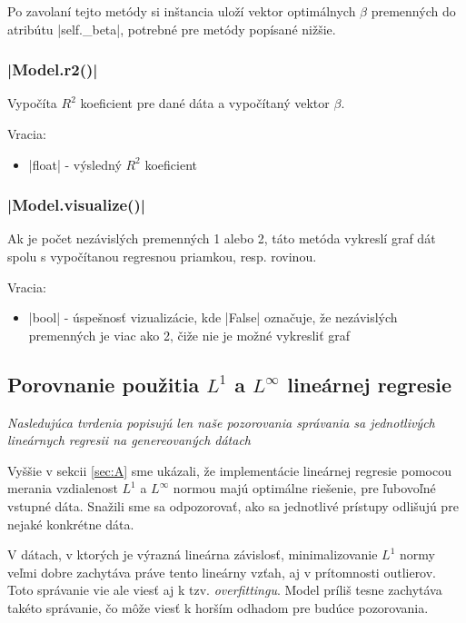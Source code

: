 \documentclass[report.tex]{subfiles}
\begin{document}
Po zavolaní tejto metódy si inštancia uloží vektor optimálnych $\beta$ premenných do atribútu \pyth|self._beta|, potrebné pre metódy popísané nižšie.

\subsubsection*{\pyth|Model.r2()|}

Vypočíta $R^2$ koeficient pre dané dáta a vypočítaný vektor $\beta$.

Vracia:

\begin{itemize}
	\item \pyth|float| - výsledný $R^2$ koeficient
\end{itemize}

\subsubsection*{\pyth|Model.visualize()|}

Ak je počet nezávislých premenných 1 alebo 2, táto metóda vykreslí graf dát spolu s vypočítanou regresnou priamkou, resp. rovinou. 

Vracia:

\begin{itemize}
	\item \pyth|bool| - úspešnosť vizualizácie, kde \pyth|False| označuje, že nezávislých premenných je viac ako 2, čiže nie je možné vykresliť graf
\end{itemize}

\subsection{Porovnanie použitia $L^1$ a $L^{\infty}$ lineárnej regresie}

\textit{Nasledujúca tvrdenia popisujú len naše pozorovania správania sa jednotlivých lineárnych regresii na genereovaných dátach}

Vyššie v sekcii \ref{sec:A} sme ukázali, že implementácie lineárnej regresie pomocou merania vzdialenost $L^1$ a $L^{\infty}$ normou majú optimálne riešenie, pre ľubovoľné vstupné dáta. Snažili sme sa odpozorovať, ako sa jednotlivé prístupy odlišujú pre nejaké konkrétne dáta.

V dátach, v ktorých je výrazná lineárna závislosť, minimalizovanie $L^1$ normy veľmi dobre zachytáva práve tento lineárny vzťah, aj v prítomnosti outlierov. Toto správanie vie ale viesť aj k tzv. \textit{overfittingu}. Model príliš tesne zachytáva takéto správanie, čo môže viesť k horším odhadom pre budúce pozorovania.
\end{document}
